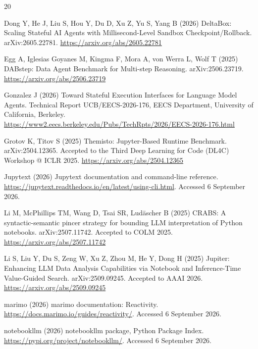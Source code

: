 \documentclass[11pt]{article}
\begin{document}

\begin{thebibliography}{20}
\raggedright

Dong Y, He J, Liu S, Hou Y, Du D, Xu Z, Yu S, Yang B (2026) DeltaBox: Scaling
Stateful AI Agents with Millisecond-Level Sandbox Checkpoint/Rollback.
arXiv:2605.22781. \url{https://arxiv.org/abs/2605.22781}

Egg A, Iglesias Goyanes M, Kingma F, Mora A, von Werra L, Wolf T (2025)
DABstep: Data Agent Benchmark for Multi-step Reasoning. arXiv:2506.23719.
\url{https://arxiv.org/abs/2506.23719}

Gonzalez J (2026) Toward Stateful Execution Interfaces for Language Model
Agents. Technical Report UCB/EECS-2026-176, EECS Department, University of
California, Berkeley.
\url{https://www2.eecs.berkeley.edu/Pubs/TechRpts/2026/EECS-2026-176.html}

Grotov K, Titov S (2025) Themisto: Jupyter-Based Runtime Benchmark.
arXiv:2504.12365. Accepted to the Third Deep Learning for Code (DL4C)
Workshop @ ICLR 2025. \url{https://arxiv.org/abs/2504.12365}

Jupytext (2026) Jupytext documentation and command-line reference.
\url{https://jupytext.readthedocs.io/en/latest/using-cli.html}. Accessed 6
September 2026.

Li M, McPhillips TM, Wang D, Tsai SR, Ludäscher B (2025) CRABS: A
syntactic-semantic pincer strategy for bounding LLM interpretation of Python
notebooks. arXiv:2507.11742. Accepted to COLM 2025.
\url{https://arxiv.org/abs/2507.11742}

Li S, Liu Y, Du S, Zeng W, Xu Z, Zhou M, He Y, Dong H (2025) Jupiter:
Enhancing LLM Data Analysis Capabilities via Notebook and Inference-Time
Value-Guided Search. arXiv:2509.09245. Accepted to AAAI 2026.
\url{https://arxiv.org/abs/2509.09245}

marimo (2026) marimo documentation: Reactivity.
\url{https://docs.marimo.io/guides/reactivity/}. Accessed 6 September 2026.

notebookllm (2026) notebookllm package, Python Package Index.
\url{https://pypi.org/project/notebookllm/}. Accessed 6 September 2026.


\end{thebibliography}
\end{document}
